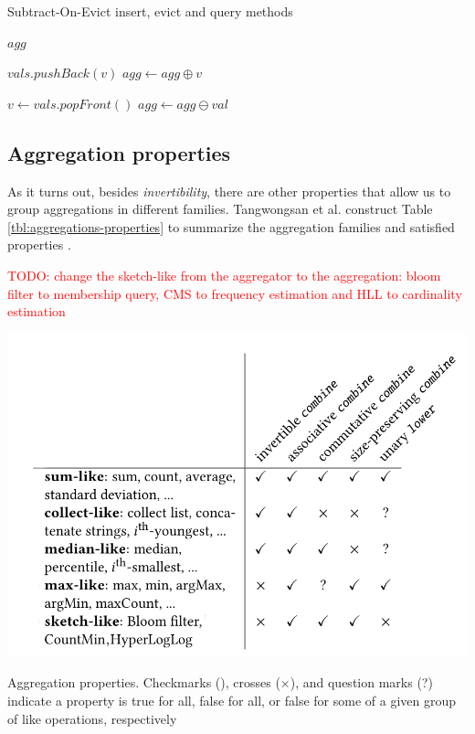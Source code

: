 \begin{algorithm}
    \caption{Subtract-On-Evict insert, evict and query methods}
    \label{pseudo:soe}
    \begin{algorithmic}[1]
        
            \State \Return $agg$
        \EndFunction
        
        
        
            \State $vals.pushBack(v)$
            \State $agg \gets agg \oplus v$
        \EndFunction
        
        
        
            \State $v \gets vals.popFront()$
            \State $agg \gets agg \ominus val$
        \EndFunction
    \end{algorithmic}
\end{algorithm}

\subsection{Aggregation properties}
\label{sec:agg-properties}

As it turns out, besides \textit{invertibility}, there are other properties that allow us to group aggregations in different families. Tangwongsan et al. construct Table \ref{tbl:aggregations-properties} to summarize the aggregation families and satisfied properties \cite{Tangwongsan-Sliding-Window-Aggregation-Algorithms}.

\textcolor{red}{TODO: change the sketch-like from the aggregator to the aggregation: bloom filter to membership query, CMS to frequency estimation and HLL to cardinality estimation}

\begin{table}[!htb]
    \begin{center}
      \includegraphics[scale=0.4]{figures/aggregation-operations-properties.png}
      \caption[Aggregation properties]{Aggregation properties. Checkmarks (\checkmark), crosses ($\times$), and question marks (?) indicate a property is true for all, false for all, or false for some of a given group of like operations, respectively}
      \label{tbl:aggregations-properties}
    \end{center}
\end{table}

